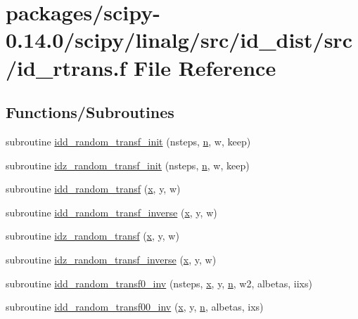 \hypertarget{id__rtrans_8f}{}\section{packages/scipy-\/0.14.0/scipy/linalg/src/id\+\_\+dist/src/id\+\_\+rtrans.f File Reference}
\label{id__rtrans_8f}
\subsection*{Functions/\+Subroutines}
\begin{DoxyCompactItemize}
\item 
subroutine \hyperlink{id__rtrans_8f_a73165bfa3108d6a3c4acad82908c6744}{idd\+\_\+random\+\_\+transf\+\_\+init} (nsteps, \hyperlink{indexexpr_8h_ab427e2e2b4d6cec55fa088ea2a692ace}{n}, w, keep)
\item 
subroutine \hyperlink{id__rtrans_8f_a005a5c8f9ef8847fc3669709cdf93c94}{idz\+\_\+random\+\_\+transf\+\_\+init} (nsteps, \hyperlink{indexexpr_8h_ab427e2e2b4d6cec55fa088ea2a692ace}{n}, w, keep)
\item 
subroutine \hyperlink{id__rtrans_8f_ac8306aacc2b48aa15822c00d5c16e6f8}{idd\+\_\+random\+\_\+transf} (\hyperlink{vecnorm1_8cc_ac73eed9e41ec09d58f112f06c2d6cb63}{x}, y, w)
\item 
subroutine \hyperlink{id__rtrans_8f_a5b755a02bc36b90f65ea4be1ca9652a3}{idd\+\_\+random\+\_\+transf\+\_\+inverse} (\hyperlink{vecnorm1_8cc_ac73eed9e41ec09d58f112f06c2d6cb63}{x}, y, w)
\item 
subroutine \hyperlink{id__rtrans_8f_a44cd41cb03ff0f1eb440731fed0ece8f}{idz\+\_\+random\+\_\+transf} (\hyperlink{vecnorm1_8cc_ac73eed9e41ec09d58f112f06c2d6cb63}{x}, y, w)
\item 
subroutine \hyperlink{id__rtrans_8f_a4bc525482690a39484ef216ce8b42c3e}{idz\+\_\+random\+\_\+transf\+\_\+inverse} (\hyperlink{vecnorm1_8cc_ac73eed9e41ec09d58f112f06c2d6cb63}{x}, y, w)
\item 
subroutine \hyperlink{id__rtrans_8f_a274e92bfb34f2b66e1076e9c8399853a}{idd\+\_\+random\+\_\+transf0\+\_\+inv} (nsteps, \hyperlink{vecnorm1_8cc_ac73eed9e41ec09d58f112f06c2d6cb63}{x}, y, \hyperlink{indexexpr_8h_ab427e2e2b4d6cec55fa088ea2a692ace}{n}, w2, albetas, iixs)
\item 
subroutine \hyperlink{id__rtrans_8f_a546de59539cbbc5d2e9fd0a0be51565e}{idd\+\_\+random\+\_\+transf00\+\_\+inv} (\hyperlink{vecnorm1_8cc_ac73eed9e41ec09d58f112f06c2d6cb63}{x}, y, \hyperlink{indexexpr_8h_ab427e2e2b4d6cec55fa088ea2a692ace}{n}, albetas, ixs)

\end{DoxyCompactItemize}
